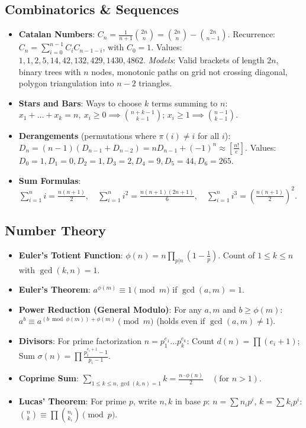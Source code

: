 \subsection*{Combinatorics \& Sequences}
\begin{itemize}
    \setlength\itemsep{0.3em}
    \item \textbf{Catalan Numbers}: $C_n = \frac{1}{n+1}\binom{2n}{n} = \binom{2n}{n} - \binom{2n}{n-1}$.
    Recurrence: $C_n = \sum_{i=0}^{n-1} C_i C_{n-1-i}$, with $C_0=1$.
    Values: $1, 1, 2, 5, 14, 42, 132, 429, 1430, 4862$.
    \textit{Models}: Valid brackets of length $2n$, binary trees with $n$ nodes, monotonic paths on grid not crossing diagonal, polygon triangulation into $n-2$ triangles.
    \item \textbf{Stars and Bars}: Ways to choose $k$ terms summing to $n$:
    $x_1 + \dots + x_k = n, \ x_i \ge 0 \implies \binom{n+k-1}{k-1}$; \quad
    $x_i \ge 1 \implies \binom{n-1}{k-1}$.
    \item \textbf{Derangements} (permutations where $\pi(i) \ne i$ for all $i$):
    $D_n = (n-1)(D_{n-1} + D_{n-2}) = n D_{n-1} + (-1)^n \approx \left[\frac{n!}{e}\right]$.
    Values: $D_0=1, D_1=0, D_2=1, D_3=2, D_4=9, D_5=44, D_6=265$.
    \item \textbf{Sum Formulas}:
    $\sum_{i=1}^n i = \frac{n(n+1)}{2}, \quad
    \sum_{i=1}^n i^2 = \frac{n(n+1)(2n+1)}{6}, \quad
    \sum_{i=1}^n i^3 = \left(\frac{n(n+1)}{2}\right)^2$.
\end{itemize}

\subsection*{Number Theory}
\begin{itemize}
    \setlength\itemsep{0.3em}
    \item \textbf{Euler's Totient Function}: $\phi(n) = n \prod_{p|n} \left(1 - \frac{1}{p}\right)$. Count of $1 \le k \le n$ with $\gcd(k, n) = 1$.
    \item \textbf{Euler's Theorem}: $a^{\phi(m)} \equiv 1 \pmod m$ if $\gcd(a, m) = 1$.
    \item \textbf{Power Reduction (General Modulo)}: For any $a, m$ and $b \ge \phi(m)$:
    $a^b \equiv a^{(b \bmod \phi(m)) + \phi(m)} \pmod m$ (holds even if $\gcd(a, m) \ne 1$).
    \item \textbf{Divisors}: For prime factorization $n = p_1^{e_1} \dots p_k^{e_k}$:
    Count $d(n) = \prod (e_i + 1)$; \quad
    Sum $\sigma(n) = \prod \frac{p_i^{e_i+1}-1}{p_i-1}$.
    \item \textbf{Coprime Sum}: $\sum_{1 \le k \le n, \gcd(k, n)=1} k = \frac{n \cdot \phi(n)}{2} \quad (\text{for } n > 1)$.
    \item \textbf{Lucas' Theorem}: For prime $p$, write $n, k$ in base $p$: $n = \sum n_i p^i$, $k = \sum k_i p^i$:
    $\binom{n}{k} \equiv \prod \binom{n_i}{k_i} \pmod p$.
\end{itemize}

